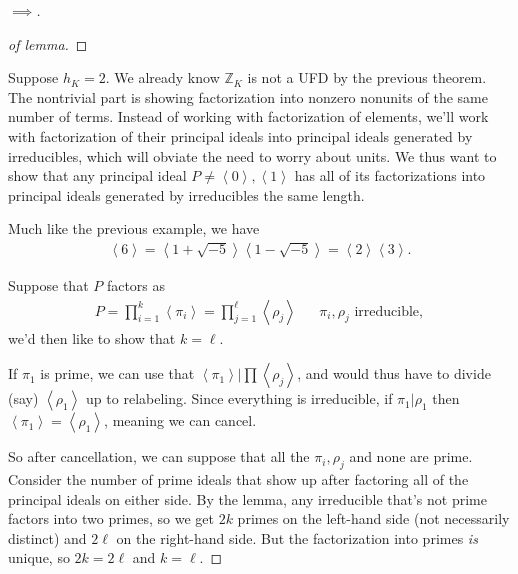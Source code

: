\begin{proof}[$\implies$]
\begin{proof}[of lemma]
\end{proof}

Suppose \(h_K = 2\). We already know \({\mathbb{Z}}_K\) is not a UFD by
the previous theorem. The nontrivial part is showing factorization into
nonzero nonunits of the same number of terms. Instead of working with
factorization of elements, we'll work with factorization of their
principal ideals into principal ideals generated by irreducibles, which
will obviate the need to worry about units. We thus want to show that
any principal ideal
\(P \neq \left\langle{ 0 }\right\rangle, \left\langle{ 1 }\right\rangle\)
has all of its factorizations into principal ideals generated by
irreducibles the same length.

\begin{example}[?]

Much like the previous example, we have
\begin{align*}
\left\langle{ 6 }\right\rangle = \left\langle{ 1 + \sqrt{-5} }\right\rangle \left\langle{ 1 - \sqrt{-5} }\right\rangle = \left\langle{ 2 }\right\rangle \left\langle{ 3 }\right\rangle     
.\end{align*}

\end{example}

Suppose that \(P\) factors as
\begin{align*}
P = 
\prod_{i=1}^k \left\langle{ \pi_i }\right\rangle
=
\prod_{j=1}^\ell \left\langle{ \rho_j }\right\rangle
&&
\pi_i, \rho_j \text{ irreducible}
,\end{align*}
we'd then like to show that \(k=\ell\).

\begin{observation}

If \(\pi_1\) is prime, we can use that
\(\left\langle{ \pi_1 }\right\rangle\mathrel{\Big|}\prod \left\langle{ \rho_j }\right\rangle\),
and would thus have to divide (say)
\(\left\langle{ \rho_1 }\right\rangle\) up to relabeling. Since
everything is irreducible, if \(\pi_1 \mathrel{\Big|}\rho_1\) then
\(\left\langle{ \pi_1 }\right\rangle= \left\langle{ \rho_1 }\right\rangle\),
meaning we can cancel.

\end{observation}

So after cancellation, we can suppose that all the \(\pi_i, \rho_j\) and
none are prime. Consider the number of prime ideals that show up after
factoring all of the principal ideals on either side. By the lemma, any
irreducible that's not prime factors into two primes, so we get \(2k\)
primes on the left-hand side (not necessarily distinct) and \(2\ell\) on
the right-hand side. But the factorization into primes \emph{is} unique,
so \(2k=2\ell\) and \(k=\ell\).

\end{proof}

